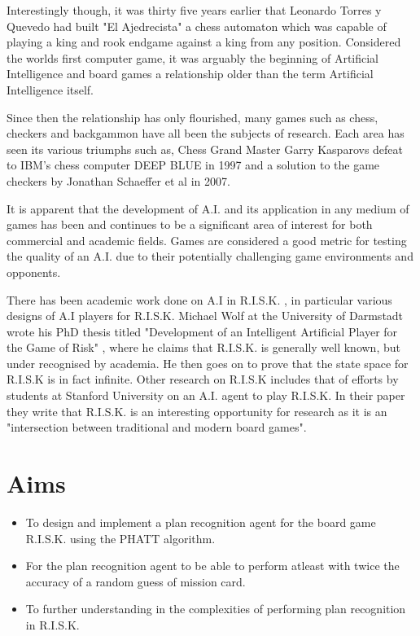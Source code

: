 \documentclass[parskip]{cs4rep}
\begin{document}
Interestingly though, it was thirty five years earlier that Leonardo Torres y Quevedo had built "El Ajedrecista" a chess automaton which was capable of playing a king and rook endgame against a king from any position. Considered the worlds first computer game, it was arguably the beginning of Artificial Intelligence and board games a relationship older than the term Artificial Intelligence itself. 

Since then the relationship has only flourished, many games such as chess, checkers and backgammon have all been the subjects of research. Each area has seen its various triumphs such as, Chess Grand Master Garry Kasparovs defeat to IBM's chess computer DEEP BLUE in 1997 and a solution to the game checkers by Jonathan Schaeffer et al in 2007.

It is apparent that the development of A.I. and its application in any medium of games has been and continues to be a significant area of interest for both commercial and academic fields. Games are considered a good metric for testing the quality of an A.I. due to their potentially challenging game environments and opponents.

There has been academic work done on A.I in R.I.S.K. , in particular various designs of A.I players for R.I.S.K. Michael Wolf at the University of Darmstadt wrote his PhD thesis titled "Development of an Intelligent Artificial Player for the Game of Risk" \cite{michaelwolf}, where he claims that R.I.S.K. is generally well known, but under recognised by academia. He then goes on to prove that the state space for R.I.S.K is in fact infinite. Other research on R.I.S.K includes that of efforts by students at Stanford University on an A.I. \cite{jlozanodbratz} agent to play R.I.S.K. In their paper they write that R.I.S.K. is an interesting opportunity for research as it is an "intersection between traditional and modern board games".

\section{Aims}

\begin{itemize}
\item
To design and implement a plan recognition agent for the board game R.I.S.K. using the PHATT algorithm.
\item
For the plan recognition agent to be able to perform atleast with twice the accuracy of a random guess of mission card.
\item
To further understanding in the complexities of performing plan recognition in R.I.S.K.
\end{itemize}
\end{document}
